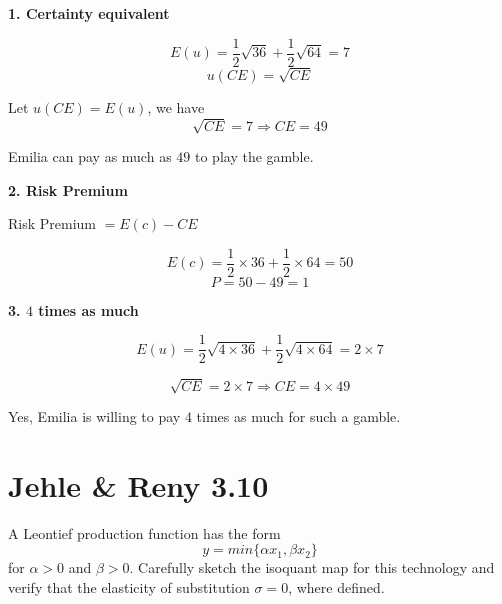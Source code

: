 \documentclass{article}
\begin{document}
\textbf{1. Certainty equivalent}

$$E(u) = \frac{1}{2}\sqrt{36} +  \frac{1}{2}\sqrt{64} =7$$
$$u(CE) = \sqrt{CE}$$

Let $u(CE) = E(u)$, we have $$\sqrt{CE} = 7 \Rightarrow CE = 49$$

Emilia can pay as much as $49$ to play the gamble.

\vspace{4mm}

\textbf{2. Risk Premium}

 Risk Premium $= E(c) - CE$

 $$E(c)= \frac{1}{2} \times 36 + \frac{1}{2} \times 64 = 50$$
 $$P = 50 - 49 = 1$$

\textbf{3. $4$ times as much}

$$E(u) = \frac{1}{2}\sqrt{4 \times 36} +  \frac{1}{2}\sqrt{4 \times 64} =2 \times 7$$

$$\sqrt{CE} = 2 \times 7 \Rightarrow CE = 4 \times49$$

Yes, Emilia is willing to pay $4$ times as much for such a gamble.


\newpage

\section{Jehle \& Reny 3.10}

A Leontief production function has the form $$y = min\{\alpha x_1, \beta x_2 \}$$
for $\alpha > 0$ and $\beta > 0$. Carefully sketch the isoquant map for this technology and verify that the
elasticity of substitution $\sigma = 0$, where defined.
\end{document}
